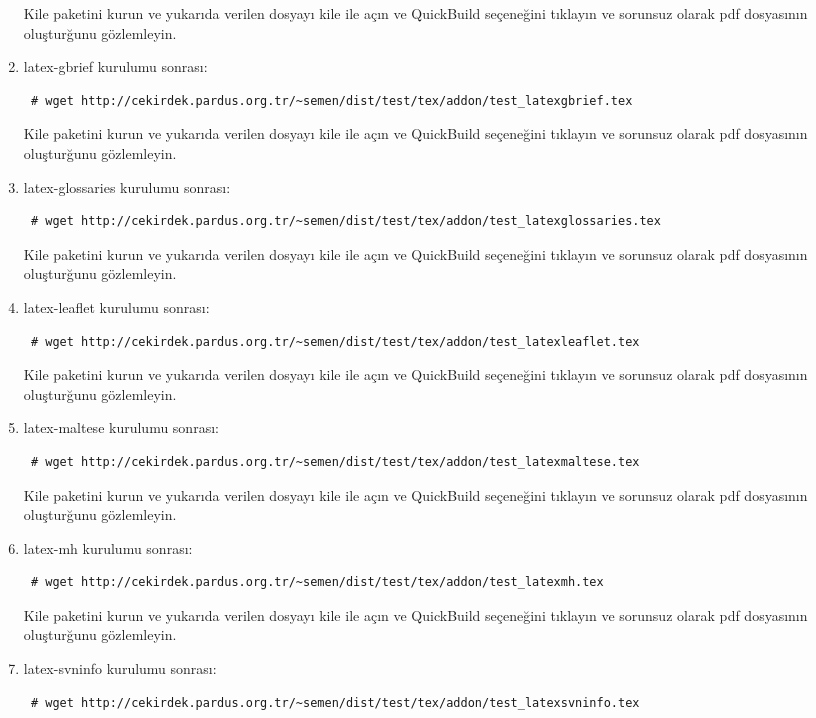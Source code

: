 \documentclass[a4paper,10pt]{article}
\begin{document}
\begin{enumerate}
Kile paketini kurun ve yukarıda verilen dosyayı kile ile açın ve QuickBuild  seçeneğini tıklayın ve sorunsuz olarak pdf dosyasının oluşturğunu gözlemleyin.
\item  latex-gbrief kurulumu sonrası:
\begin{verbatim}
 # wget http://cekirdek.pardus.org.tr/~semen/dist/test/tex/addon/test_latexgbrief.tex
\end{verbatim}

Kile paketini kurun ve yukarıda verilen dosyayı kile ile açın ve QuickBuild  seçeneğini tıklayın ve sorunsuz olarak pdf dosyasının oluşturğunu gözlemleyin.
\item  latex-glossaries kurulumu sonrası:
\begin{verbatim}
 # wget http://cekirdek.pardus.org.tr/~semen/dist/test/tex/addon/test_latexglossaries.tex
\end{verbatim}

Kile paketini kurun ve yukarıda verilen dosyayı kile ile açın ve QuickBuild  seçeneğini tıklayın ve sorunsuz olarak pdf dosyasının oluşturğunu gözlemleyin.
\item  latex-leaflet kurulumu sonrası:
\begin{verbatim}
 # wget http://cekirdek.pardus.org.tr/~semen/dist/test/tex/addon/test_latexleaflet.tex
\end{verbatim}

Kile paketini kurun ve yukarıda verilen dosyayı kile ile açın ve QuickBuild  seçeneğini tıklayın ve sorunsuz olarak pdf dosyasının oluşturğunu gözlemleyin.
\item  latex-maltese kurulumu sonrası:
\begin{verbatim}
 # wget http://cekirdek.pardus.org.tr/~semen/dist/test/tex/addon/test_latexmaltese.tex
\end{verbatim}

Kile paketini kurun ve yukarıda verilen dosyayı kile ile açın ve QuickBuild  seçeneğini tıklayın ve sorunsuz olarak pdf dosyasının oluşturğunu gözlemleyin.

\item  latex-mh kurulumu sonrası:
\begin{verbatim}
 # wget http://cekirdek.pardus.org.tr/~semen/dist/test/tex/addon/test_latexmh.tex
\end{verbatim}

Kile paketini kurun ve yukarıda verilen dosyayı kile ile açın ve QuickBuild  seçeneğini tıklayın ve sorunsuz olarak pdf dosyasının oluşturğunu gözlemleyin.
\item  latex-svninfo kurulumu sonrası:
\begin{verbatim}
 # wget http://cekirdek.pardus.org.tr/~semen/dist/test/tex/addon/test_latexsvninfo.tex
\end{verbatim}


\end{enumerate}
\end{document}
